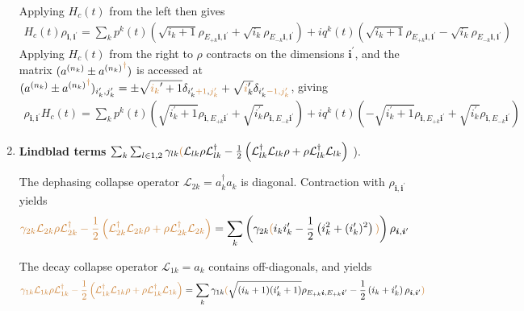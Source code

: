 \documentclass[letterpaper]{article}
\newcommand{\Ell}{\mathcal{L}}
\newcommand{\bfi}{\boldsymbol{i}}
\newcommand{\YC}[1]{{\textcolor{Bronze}{#1}}}
\begin{document}
\begin{enumerate}
      Applying $H_c(t)$ from the left then gives 
      \begin{align}\label{eq:HcLeft}
        H_c(t) \rho_{\bfi, \bfi^\prime} = \sum_k p^k(t) \left(\sqrt{i_k+1}
        \rho_{E_{+k}\bfi,\bfi^\prime} + \sqrt{i_k} \rho_{E_{-k}
        \bfi,\bfi^\prime} \right) + iq^k(t) \left(\sqrt{i_k+1}
        \rho_{E_{+k}\bfi,\bfi^\prime} - \sqrt{i_k} \rho_{E_{-k}\bfi,\bfi^\prime}
        \right)
      \end{align}
      Applying $H_c(t)$ from the right to $\rho$ contracts on the dimensions
      $\bfi^\prime$, and the matrix $(a^{(n_k)} \pm {a^{(n_k)}}^{\YC{\dagger}})$
      is accessed at $(a^{(n_k) } \pm
      {a^{(n_k)}}^{\YC{\dagger}})_{i_k^\prime,j_k^\prime} = \pm
      \sqrt{\YC{i_k}^\prime+1} \delta_{i_k^\prime\YC{+1}, \YC{j_k^\prime}} +
      \sqrt{\YC{i}_k^\prime}
      \delta_{i_k^\prime\YC{-1, j_k^\prime}}$, giving
      \begin{align}\label{eq:HcRight}
        \rho_{\bfi, \bfi^\prime} H_c(t) = \sum_k p^k(t)
        \left(\sqrt{i_k^\prime+1} \rho_{\bfi,E_{+k}\bfi^\prime} +
        \sqrt{i_k^\prime} \rho_{\bfi,E_{-k}\bfi^\prime} \right) + iq^k(t) \left(
        - \sqrt{i_k^\prime+1} \rho_{\bfi,E_{+k}\bfi^\prime} + \sqrt{i_k^\prime}
        \rho_{\bfi,E_{-k}\bfi^\prime} \right)
      \end{align}

    \item \textbf{Lindblad terms} $\sum_k \sum_{l\in{1,2}} \gamma_{lk} \YC{(}
      \Ell_{lk} \rho \Ell_{lk}^\dag - \frac{1}{2} \left( \Ell_{lk}^\dag
      \Ell_{lk} \rho + \rho \Ell_{lk}^\dag \Ell_{lk}\right)$ \YC{)}.
    
    The dephasing collapse operator $\Ell_{2k} = a_k^\dag a_k$ is diagonal.    
    Contraction with $\rho_{\bfi,\bfi^\prime}$ yields
    \begin{align}\label{eq:actionDephasing}
      \YC{\gamma_{2k}\Ell_{2k}\rho\Ell_{2k}^\dagger -\frac 12
        \left (\Ell_{2k}^\dagger\Ell_{2k}\rho +
        \rho \Ell_{2k}^\dagger\Ell_{2k} \right )} =
        \sum_k \left( \gamma_{2k} \YC{(} i_ki_k^\prime - \frac 12 \left( i_k^2 +
        (i_k^\prime)^2\right) \YC{)} \right) \rho_{\bfi,\bfi^\prime}
    \end{align}

    The decay collapse operator $\Ell_{1k} = a_k$ contains off-diagonals, and
    yields
    \begin{align}\label{eq:actionDecayCollapse}
      \YC{\gamma_{1k}\Ell_{1k}\rho\Ell_{1k}^\dagger -\frac 12
        \left (\Ell_{1k}^\dagger\Ell_{1k}\rho +
        \rho \Ell_{1k}^\dagger\Ell_{1k} \right )} =
        \sum_k \gamma_{1k} \YC{ (} \sqrt{(i_k+1)(i_k^\prime+1)}
        \rho_{E_{+k}\bfi, E_{+k}\bfi^\prime} - \frac 12 \left( i_k+ i_k^\prime
        \right)\rho_{\bfi, \bfi^\prime} \YC{ ) }
    \end{align}
      
\end{enumerate}
\end{document}
